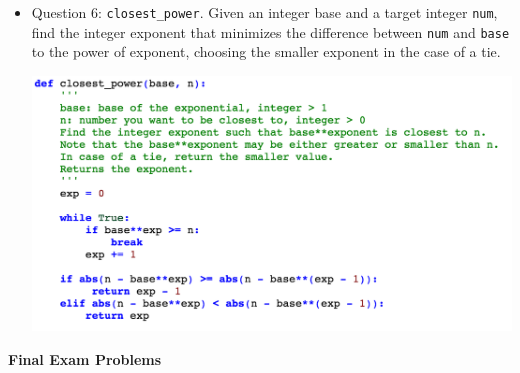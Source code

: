 \begin{itemize}
\item Question 6: \texttt{closest\_power}. Given an integer base and a target integer \texttt{num}, find the integer exponent that minimizes the difference between \texttt{num} and \texttt{base} to the power of exponent, choosing the smaller exponent in the case of a tie.

\includegraphics[scale=0.65]{Body/figures/grovercode/fig_closest_power}
\end{itemize}

{\bf Final Exam Problems}

